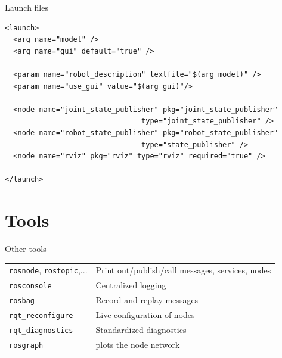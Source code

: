 \documentclass[compress]{beamer}
\begin{document}
\begin{frame}[fragile]{Launch files}

\begin{verbatim}
<launch>
  <arg name="model" />
  <arg name="gui" default="true" />

  <param name="robot_description" textfile="$(arg model)" />
  <param name="use_gui" value="$(arg gui)"/>

  <node name="joint_state_publisher" pkg="joint_state_publisher" 
                                type="joint_state_publisher" />
  <node name="robot_state_publisher" pkg="robot_state_publisher" 
                                type="state_publisher" />
  <node name="rviz" pkg="rviz" type="rviz" required="true" />

</launch>
\end{verbatim}


\end{frame}

\section{Tools}



\begin{frame}{Other tools}
    \begin{table}[]
        \begin{tabularx}{\linewidth}{l>{\raggedright}X}
            \toprule
            \texttt{rosnode}, \texttt{rostopic},... & Print out/publish/call messages, services, nodes \tabularnewline
            \texttt{rosconsole} & Centralized logging \tabularnewline
            \texttt{rosbag} & Record and replay messages \tabularnewline
            \texttt{rqt\_reconfigure} & Live configuration of nodes \tabularnewline
            \texttt{rqt\_diagnostics} & Standardized diagnostics \tabularnewline
            \texttt{rosgraph} & plots the node network \tabularnewline
            \bottomrule
        \end{tabularx}
    \end{table}
\end{frame}
\end{document}
